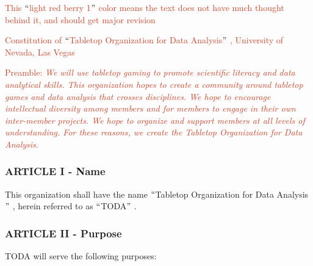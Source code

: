 \documentclass[12pt]{report}
\begin{document}
\begin{Center}
\textcolor[HTML]{CC4125}{This $``$light red berry 1$"$  color means the text does not have much thought behind it, and should get major revision}
\end{Center}\par

\begin{Center}
\textcolor[HTML]{CC4125}{C}\textcolor[HTML]{CC4125}{onstitution of $``$Tabletop Organization for Data Analysis$"$ , University of Nevada, Las Vegas}
\end{Center}\par


\vspace{\baselineskip}
\begin{Center}
\textcolor[HTML]{CC4125}{Preamble:\textit{ We will use tabletop gaming to promote scientific literacy and data analytical skills. This organization hopes to create a community around tabletop games and data analysis that crosses disciplines. We hope to encourage intellectual diversity among members and for members to engage in their own inter-member projects. We hope to organize and support members at all levels of understanding. For these reasons, we create the Tabletop Organization for Data Analysis.}}
\end{Center}\par

\subsubsection*{ARTICLE I - Name}
\begin{adjustwidth}{0.5in}{0.0in}
This organization shall have the name $``$Tabletop Organization for Data Analysis$"$ , herein referred to as $``$TODA$"$ .\par

\end{adjustwidth}


\vspace{\baselineskip}
\subsubsection*{ARTICLE II - Purpose}
TODA will serve the following purposes:\par
\end{document}
